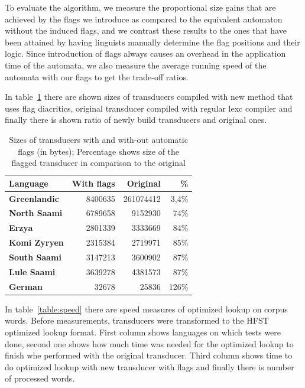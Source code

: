 \documentclass[11pt]{article}
\begin{document}
To evaluate the algorithm, we measure the proportional size gains that are
achieved by the flags we introduce as compared to the equivalent automaton
without the induced flags, and we contrast these results to the ones that have
been attained by having linguists manually determine the flag positions and
their logic. Since introduction of flags always causes an overhead in the
application time of the automata, we also measure the average running speed
of the automata with our flags to get the trade-off ratios.

In table~\ref{table:sizes} there are shown sizes of transducers compiled with new method that uses flag diacritics, original transducer compiled with regular lexc compiler and finally there is shown ratio of newly build transducers and original ones.

\begin{table}
    \centering
    \begin{tabular}{|l|r|r|r|}
        \hline
        \bf Language & \bf With flags & \bf Original & \bf \% \\
        \hline
        \bf Greenlandic & 8400635 & 261074412 & 3,4\%  \\
        \bf North Saami & 6789658 & 9152930 & 74\%  \\
        \bf Erzya & 2801339 & 3333669 & 84\%  \\
        \bf Komi Zyryen & 2315384 & 2719971 & 85\%  \\
        \bf South Saami & 3147213 & 3600902 & 87\%  \\
        \bf Lule Saami & 3639278 & 4381573 & 87\%  \\
        \bf German & 32678 & 25836 & 126\%  \\
        \hline
    \end{tabular}
    \caption{Sizes of transducers with and with-out automatic flags (in bytes); Percentage shows size of the flagged transducer in comparison to the original
    \label{table:sizes}}
\end{table}


In table~\ref{table:speed} there are speed measures of optimized lookup on corpus words. Before measurements, transducers were transformed to the HFST optimized lookup format. First column shows languages on which tests were done, second one shows how much time was needed for the optimized lookup to finish whe performed with the original transducer. Third column shows time to do optimized lookup with new transducer with flags and finally there is number of processed words.
\end{document}
